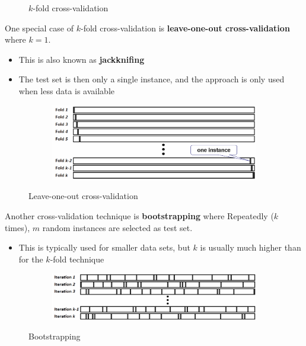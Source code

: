 \begin{figure}[H]
  \caption{$k$-fold cross-validation}
  \label{fig:7_kfold_cv}
\end{figure}

One special case of $k$-fold cross-validation is \textbf{leave-one-out cross-validation} where $k=1$.
\begin{itemize}
  \item This is also known as \textbf{jackknifing}
  \item The test set is then only a single instance, and the approach is only used when less data is available
\end{itemize}

\begin{figure}[H]
  \centering
  \begin{subfigure}{0.6\textwidth}
    \centering
    \includegraphics[width=\textwidth]{assets/sl/cross_val__1fold.png}
  \end{subfigure}

  \caption{Leave-one-out cross-validation}
  \label{fig:7_1fold_cv}
\end{figure}

Another cross-validation technique is \textbf{bootstrapping} where Repeatedly ($k$ times), $m$ random instances are selected as test set. 
\begin{itemize}
  \item This is typically used for smaller data sets, but $k$ is usually much higher than for the $k$-fold technique
\end{itemize}

\begin{figure}[H]
  \centering
  \begin{subfigure}{0.6\textwidth}
    \centering
    \includegraphics[width=\textwidth]{assets/sl/cross_val__bootstrapping.png}
  \end{subfigure}

  \caption{Bootstrapping}
  \label{fig:7_bootstrapping}
\end{figure}

